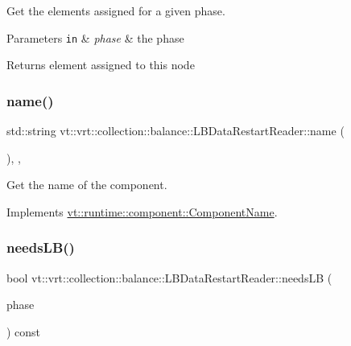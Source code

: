 Get the elements assigned for a given phase. 


\begin{DoxyParams}[1]{Parameters}
\mbox{\tt in}  & {\em phase} & the phase\\
\hline
\end{DoxyParams}
\begin{DoxyReturn}{Returns}
element assigned to this node 
\end{DoxyReturn}
\mbox{\label{structvt_1_1vrt_1_1collection_1_1balance_1_1_l_b_data_restart_reader_a2d715003c589c23a80346e4f84443fc4}} 
\subsubsection{\texorpdfstring{name()}{name()}}
{\footnotesize\ttfamily std\+::string vt\+::vrt\+::collection\+::balance\+::\+L\+B\+Data\+Restart\+Reader\+::name (\begin{DoxyParamCaption}{ }\end{DoxyParamCaption})\hspace{0.3cm}{\ttfamily [inline]}, {\ttfamily [override]}, {\ttfamily [virtual]}}



Get the name of the component. 



Implements \hyperlink{structvt_1_1runtime_1_1component_1_1_component_name_a33c06229bb605a2b2ceff68830d6d773}{vt\+::runtime\+::component\+::\+Component\+Name}.

\mbox{\label{structvt_1_1vrt_1_1collection_1_1balance_1_1_l_b_data_restart_reader_a332e58de26b5d93197d68a4ce3d743fe}} 
\subsubsection{\texorpdfstring{needs\+L\+B()}{needsLB()}}
{\footnotesize\ttfamily bool vt\+::vrt\+::collection\+::balance\+::\+L\+B\+Data\+Restart\+Reader\+::needs\+LB (\begin{DoxyParamCaption}\item[{\hyperlink{namespacevt_a46ce6733d5cdbd735d561b7b4029f6d7}{Phase\+Type}}]{phase }\end{DoxyParamCaption}) const\hspace{0.3cm}{\ttfamily [inline]}}




